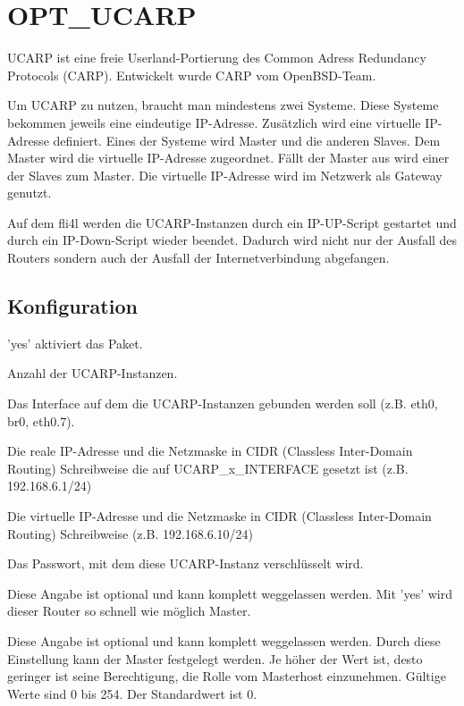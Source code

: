 {
\section {OPT\_UCARP}
}

UCARP ist eine freie Userland-Portierung des Common Adress Redundancy Protocols
(CARP). Entwickelt wurde CARP vom OpenBSD-Team.

Um UCARP zu nutzen, braucht man mindestens zwei Systeme. Diese Systeme bekommen
jeweils eine eindeutige IP-Adresse. Zusätzlich wird eine virtuelle IP-Adresse
definiert. Eines der Systeme wird Master und die anderen Slaves. Dem Master
wird die virtuelle IP-Adresse zugeordnet. Fällt der Master aus wird einer der
Slaves zum Master.
Die virtuelle IP-Adresse wird im Netzwerk als Gateway genutzt.

Auf dem fli4l werden die UCARP-Instanzen durch ein IP-UP-Script gestartet und
durch ein IP-Down-Script wieder beendet. Dadurch wird nicht nur der Ausfall des
Routers sondern auch der Ausfall der Internetverbindung abgefangen.

\subsection{Konfiguration}

\begin{description}

'yes' aktiviert das Paket.

Anzahl der UCARP-Instanzen.

Das Interface auf dem die UCARP-Instanzen gebunden werden soll
(z.B. eth0, br0, eth0.7).

Die reale IP-Adresse und die Netzmaske in CIDR (Classless Inter-Domain Routing)
Schreibweise die auf UCARP\_x\_INTERFACE gesetzt ist (z.B. 192.168.6.1/24)

Die virtuelle IP-Adresse und die Netzmaske in CIDR (Classless Inter-Domain
Routing) Schreibweise (z.B. 192.168.6.10/24)

Das Passwort, mit dem diese UCARP-Instanz verschlüsselt wird.

Diese Angabe ist optional und kann komplett weggelassen werden.
Mit 'yes' wird dieser Router so schnell wie möglich Master.

Diese Angabe ist optional und kann komplett weggelassen werden.
Durch diese Einstellung kann der Master festgelegt werden. Je höher der Wert
ist, desto geringer ist seine Berechtigung, die Rolle vom Masterhost
einzunehmen. Gültige Werte sind 0 bis 254. Der Standardwert ist 0.
\end{description}

